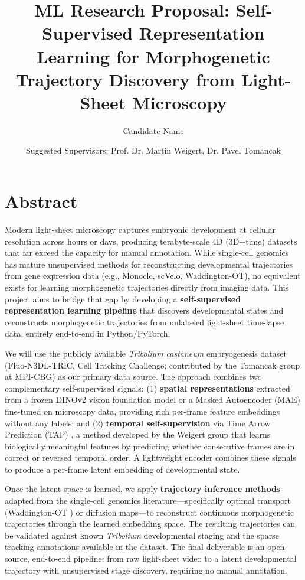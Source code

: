 \documentclass{article}
\title{ML Research Proposal: Self-Supervised Representation Learning for Morphogenetic Trajectory Discovery from Light-Sheet Microscopy}
\author{Candidate Name}
\date{Suggested Supervisors: Prof. Dr. Martin Weigert, Dr. Pavel Tomancak}
\begin{document}
\maketitle

\section*{Abstract}
Modern light-sheet microscopy captures embryonic development at cellular resolution across hours or days, producing terabyte-scale 4D (3D+time) datasets that far exceed the capacity for manual annotation. While single-cell genomics has mature unsupervised methods for reconstructing developmental trajectories from gene expression data (e.g., Monocle, scVelo, Waddington-OT), no equivalent exists for learning morphogenetic trajectories directly from imaging data. This project aims to bridge that gap by developing a \textbf{self-supervised representation learning pipeline} that discovers developmental states and reconstructs morphogenetic trajectories from unlabeled light-sheet time-lapse data, entirely end-to-end in Python/PyTorch.

We will use the publicly available \textit{Tribolium castaneum} embryogenesis dataset (Fluo-N3DL-TRIC, Cell Tracking Challenge; contributed by the Tomancak group at MPI-CBG) as our primary data source. The approach combines two complementary self-supervised signals: (1) \textbf{spatial representations} extracted from a frozen DINOv2 vision foundation model or a Masked Autoencoder (MAE) fine-tuned on microscopy data, providing rich per-frame feature embeddings without any labels; and (2) \textbf{temporal self-supervision} via Time Arrow Prediction (TAP) \cite{tap}, a method developed by the Weigert group that learns biologically meaningful features by predicting whether consecutive frames are in correct or reversed temporal order. A lightweight encoder combines these signals to produce a per-frame latent embedding of developmental state.

Once the latent space is learned, we apply \textbf{trajectory inference methods} adapted from the single-cell genomics literature---specifically optimal transport (Waddington-OT \cite{wot}) or diffusion maps---to reconstruct continuous morphogenetic trajectories through the learned embedding space. The resulting trajectories can be validated against known \textit{Tribolium} developmental staging and the sparse tracking annotations available in the dataset. The final deliverable is an open-source, end-to-end pipeline: from raw light-sheet video to a latent developmental trajectory with unsupervised stage discovery, requiring no manual annotation.
\end{document}
